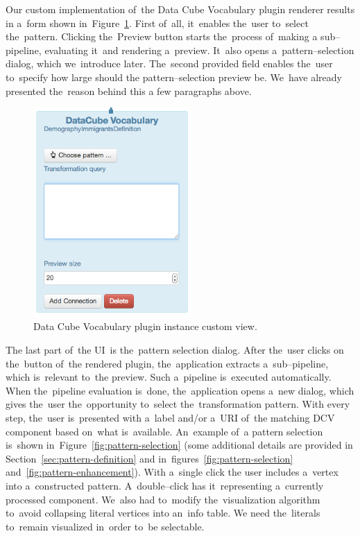 Our custom implementation of~the Data Cube Vocabulary plugin renderer results 
in a~form shown in~Figure~\ref{fig:DCV-plugin-view}. First of~all, it~enables the~user to~select the~pattern. Clicking the~Preview button starts the~process of~making a
sub--pipeline, evaluating it~and rendering a~preview. It~also opens a~pattern--selection
dialog, which we~introduce later. The~second provided field enables the~user to~specify how large should 
the pattern--selection preview be. We~have already presented the~reason behind this 
a few paragraphs above.

\begin{figure}
	\centering
	\includegraphics[width=60mm]{img/custom-dcv-piv.png}
	\caption{Data Cube Vocabulary plugin instance custom view.}
	\label{fig:DCV-plugin-view}
\end{figure}

The last part of~the UI~is the~pattern selection dialog. After the~user clicks 
on the~button of~the rendered plugin, the~application extracts a~sub--pipeline, 
which is~relevant to~the preview. Such a~pipeline is~executed
automatically. When the~pipeline evaluation is~done, the~application opens a~new 
dialog, which gives the~user the~opportunity to~select the~transformation 
pattern. With every step, the~user is~presented with a~label and/or a~URI of~the 
matching DCV component based on~what is~available. An~example of~a pattern 
selection is~shown in~Figure~\ref{fig:pattern-selection} (some additional details are provided
in Section~\ref{sec:pattern-definition}
and in~figures~\ref{fig:pattern-selection} and~\ref{fig:pattern-enhancement}).
With a~single click 
the user includes a~vertex into a~constructed pattern. A~double--click 
has it~representing a~currently processed component. We~also had to~modify the~visualization algorithm to~avoid collapsing literal vertices into an~info table. 
We need the~literals to~remain visualized in~order to~be selectable.

